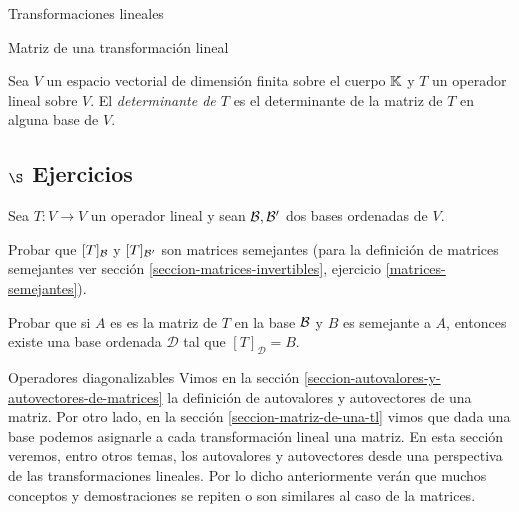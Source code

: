 \begin{chapter}{Transformaciones lineales}
\begin{section}{Matriz de una transformaci\'on lineal}
        \begin{definicion} 
                Sea $V$ un espacio vectorial de dimensión finita sobre el cuerpo $\mathbb K$ y $T$ un operador lineal sobre $V$. El \textit{determinante de $T$} es el determinante de la matriz de $T$ en alguna base de $V$.  
        \end{definicion}

        \subsection*{$\S$ Ejercicios} 

        \begin{enumex}
            \item Sea $T: V \to V$ un operador lineal y sean $\mathcal{B}, \mathcal{B}'$ dos bases ordenadas de $V$. 
                \begin{enumex}
                    \item Probar que $[T]_{\mathcal{B}}$ y $[T]_{\mathcal{B}'}$  son matrices semejantes (para la definición de matrices semejantes ver sección \ref{seccion-matrices-invertibles}, ejercicio \ref{matrices-semejantes}). 
                    \item Probar que si $A$ es es la matriz de $T$  en la base $\mathcal{B}$ y $B$ es semejante a $A$,  entonces existe una base ordenada $\mathcal{D}$ tal que $[T]_{\mathcal{D}}=B$.  
                \end{enumex}
        \end{enumex}


        \end{section}    
    
        \begin{section}{Operadores diagonalizables}\label{seccion-autovalores-y-autovectores-de-una-tl}
        Vimos en la sección  \ref{seccion-autovalores-y-autovectores-de-matrices} la definición de autovalores y autovectores de una matriz. Por otro lado,  en la sección \ref{seccion-matriz-de-una-tl} vimos que dada una base podemos asignarle a cada transformación lineal una matriz. En  esta sección veremos,  entro otros temas,  los autovalores y autovectores desde una perspectiva de las transformaciones lineales. Por lo dicho anteriormente  verán que muchos conceptos y demostraciones se repiten o son similares al caso de la matrices. 
        

\end{section}
\end{chapter}
